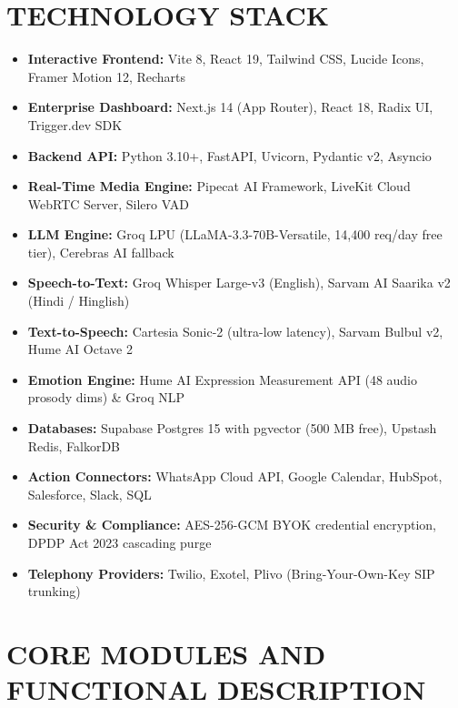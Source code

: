 \documentclass[12pt,a4paper]{article}
\begin{document}
\section{TECHNOLOGY STACK}
\begin{itemize}
    \item \textbf{Interactive Frontend:} Vite 8, React 19, Tailwind CSS, Lucide Icons, Framer Motion 12, Recharts
    \item \textbf{Enterprise Dashboard:} Next.js 14 (App Router), React 18, Radix UI, Trigger.dev SDK
    \item \textbf{Backend API:} Python 3.10+, FastAPI, Uvicorn, Pydantic v2, Asyncio
    \item \textbf{Real-Time Media Engine:} Pipecat AI Framework, LiveKit Cloud WebRTC Server, Silero VAD
    \item \textbf{LLM Engine:} Groq LPU (LLaMA-3.3-70B-Versatile, 14,400 req/day free tier), Cerebras AI fallback
    \item \textbf{Speech-to-Text:} Groq Whisper Large-v3 (English), Sarvam AI Saarika v2 (Hindi / Hinglish)
    \item \textbf{Text-to-Speech:} Cartesia Sonic-2 (ultra-low latency), Sarvam Bulbul v2, Hume AI Octave 2
    \item \textbf{Emotion Engine:} Hume AI Expression Measurement API (48 audio prosody dims) \& Groq NLP
    \item \textbf{Databases:} Supabase Postgres 15 with pgvector (500 MB free), Upstash Redis, FalkorDB
    \item \textbf{Action Connectors:} WhatsApp Cloud API, Google Calendar, HubSpot, Salesforce, Slack, SQL
    \item \textbf{Security \& Compliance:} AES-256-GCM BYOK credential encryption, DPDP Act 2023 cascading purge
    \item \textbf{Telephony Providers:} Twilio, Exotel, Plivo (Bring-Your-Own-Key SIP trunking)
\end{itemize}

\section{CORE MODULES AND FUNCTIONAL DESCRIPTION}
\end{document}
